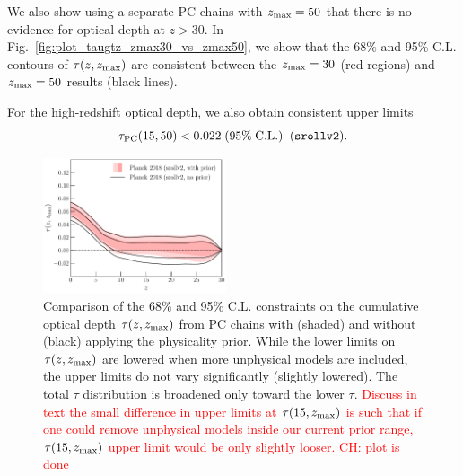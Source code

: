 \documentclass[prd,twocolumn,amsmath,amssymb,floatfix,superscriptaddress,nofootinbib]{revtex4-1}
\newcommand{\zmax}{z_{\rm max}}
\newcommand{\beq}{\begin{equation}}
\newcommand{\eeq}{\end{equation}}
\newcommand{\ch}[1]{\textcolor{red}{#1}}
\begin{document}
We also show using a separate PC chains with $\zmax = 50$ that there is no evidence for optical depth at $z>30$. 
In Fig.~\ref{fig:plot_taugtz_zmax30_vs_zmax50}, we show that the 68\% and 95\% C.L. contours of $\tau(z, \zmax)$ are consistent between the $\zmax = 30$ (red regions) and $\zmax = 50$ results (black lines).

%
%

For the high-redshift optical depth, we also obtain consistent upper limits
\beq
\tau_{\rm PC}(15, 50) < 0.022 \; (95\%\; \mathrm{C.L.})\;\;(\texttt{srollv2}).
\eeq

\begin{figure}[ht]
\includegraphics[width=0.48\textwidth]{paper/plots/pl18_taugtz_pc_zmax30_pl18_srollv2_with_and_without_physicality_prior.pdf}
\caption{Comparison of the 68\% and 95\% C.L. constraints on the cumulative optical depth $\tau(z, \zmax)$ from PC chains with (shaded) and without (black) applying the physicality prior. While the lower limits on $\tau(z, \zmax)$ are lowered when more unphysical models are included, the upper limits do not vary significantly (slightly lowered).  The total $\tau$ distribution is broadened only toward the lower $\tau$. \ch{Discuss in text the small difference in upper limits at $\tau(15, \zmax)$ is such that if one could remove unphysical models inside our current prior range, $\tau(15, \zmax)$ upper limit would be only slightly looser.} \ch{CH: plot is done}
}
%
\label{fig:plot_taugtz_2018_with_vs_without_physicality_prior}
\end{figure}
\end{document}
